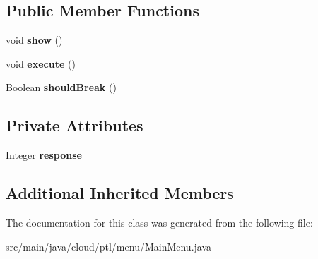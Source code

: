 \subsection*{Public Member Functions}
\begin{DoxyCompactItemize}
\item 
\mbox{\label{classcloud_1_1ptl_1_1menu_1_1MainMenu_a9ec09bf872d3cf06cf8f923ff0f31474}} 
void {\bfseries show} ()
\item 
\mbox{\label{classcloud_1_1ptl_1_1menu_1_1MainMenu_ad4f6a2488523d99f0c2c8d644c4cbed1}} 
void {\bfseries execute} ()
\item 
\mbox{\label{classcloud_1_1ptl_1_1menu_1_1MainMenu_ab8fc2592cbd3a71cc8dfc283d3cb5ddb}} 
Boolean {\bfseries should\+Break} ()
\end{DoxyCompactItemize}
\subsection*{Private Attributes}
\begin{DoxyCompactItemize}
\item 
\mbox{\label{classcloud_1_1ptl_1_1menu_1_1MainMenu_aa6233cbf30f22d819279452ccf0c812c}} 
Integer {\bfseries response}
\end{DoxyCompactItemize}
\subsection*{Additional Inherited Members}


The documentation for this class was generated from the following file\+:\begin{DoxyCompactItemize}
\item 
src/main/java/cloud/ptl/menu/Main\+Menu.\+java\end{DoxyCompactItemize}
